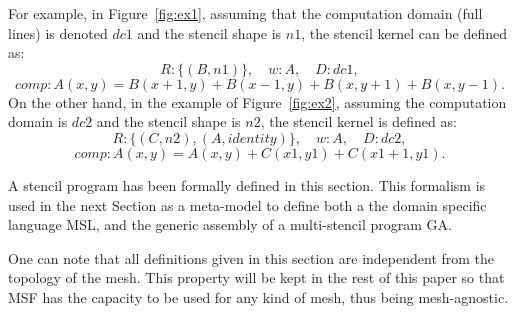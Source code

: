 For example, in Figure~\ref{fig:ex1}, assuming that the computation domain (full lines) is denoted $dc1$ and the stencil shape is $n1$, the stencil kernel can be defined as:
\begin{equation*}
R: \{(B,n1)\}, \quad w: A, \quad D: dc1,
\end{equation*}
\begin{equation*}
comp: A(x,y)=B(x+1,y)+B(x-1,y)+B(x,y+1)+B(x,y-1).
\end{equation*}
On the other hand, in the example of Figure~\ref{fig:ex2}, assuming the computation domain is $dc2$ and the stencil shape is $n2$, the stencil kernel is defined as:
\begin{equation*}
R: \{(C,n2),(A,identity)\}, \quad w: A, \quad D: dc2,
\end{equation*}
\begin{equation*}
comp: A(x,y)=A(x,y)+C(x1,y1)+C(x1+1,y1).
\end{equation*}

\medskip
A stencil program has been formally defined in this section. This formalism is used in the next Section as a meta-model to define both a the domain specific language MSL, and the generic assembly of a multi-stencil program GA.

One can note that all definitions given in this section are independent from the topology of the mesh. This property will be kept in the rest of this paper so that MSF has the capacity to be used for any kind of mesh, thus being mesh-agnostic.


